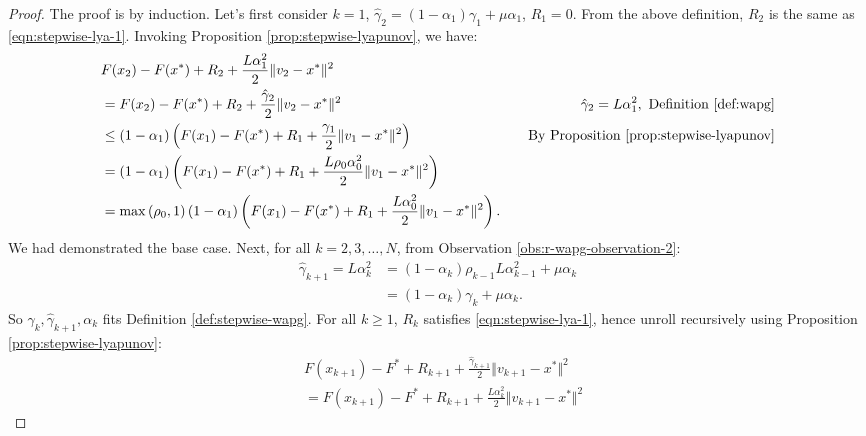 \documentclass[12pt]{article}
\begin{document}
    \begin{proof}  
        The proof is by induction. 
        Let's first consider $k = 1$, $\hat \gamma_2 = (1 - \alpha_1)\gamma_1 + \mu \alpha_1$, $R_1 = 0$. 
        From the above definition, $R_2$ is the same as \eqref{eqn:stepwise-lya-1}.
        Invoking Proposition \ref{prop:stepwise-lyapunov}, we have: 
        \begin{align*}
            & F(x_{2}) - F(x^*) + R_2 + \frac{L \alpha_1^2}{2}\Vert v_{2} - x^*\Vert^2
            \\
            & = F(x_{2}) - F(x^*) + R_2 + \frac{\hat \gamma_{2}}{2}\Vert v_{2} - x^*\Vert^2
            & \hat \gamma_2 = L \alpha_1^2 , \text{ Definition \ref{def:wapg}}
            \\
            &\le 
            (1 - \alpha_1)\left(
                F(x_1) - F(x^*) + R_1 + \frac{\gamma_1}{2}\Vert v_1 - x^*\Vert^2
            \right) 
            & \quad \text{By Proposition \ref{prop:stepwise-lyapunov}}
            \\
            &= 
            (1 - \alpha_1)\left(
                F(x_1) - F(x^*) + R_1 + \frac{L\rho_{0}\alpha_{0}^2}{2}\Vert v_1 - x^*\Vert^2
            \right) 
            \\
            &= \max\left(\rho_0, 1\right)
            (1 - \alpha_1)\left(
                F(x_1) - F(x^*) + R_1 + \frac{L\alpha_0^2}{2}\Vert v_1 - x^*\Vert^2
            \right). 
        \end{align*}
        We had demonstrated the base case. 
        Next, for all $k = 2, 3, \ldots, N$, from Observation \ref{obs:r-wapg-observation-2}: 
        \begin{align*}
            \hat \gamma_{k + 1} = L\alpha_{k}^2 
            &=(1 - \alpha_k)\rho_{k - 1}L\alpha_{k - 1}^2 + \mu\alpha_k
            \\
            &= (1 - \alpha_k)\gamma_k + \mu\alpha_k. 
        \end{align*}
        So $\gamma_k, \hat \gamma_{k + 1}, \alpha_k$ fits Definition \ref{def:stepwise-wapg}. 
        For all $k \ge 1$, $R_k$ satisfies \eqref{eqn:stepwise-lya-1}, hence unroll recursively using Proposition \ref{prop:stepwise-lyapunov}: 
        {\small
        \begin{align*}
            &
            F(x_{k + 1}) - F^* + R_{k + 1} + \frac{\hat\gamma_{k + 1}}{2}\Vert v_{k + 1} - x^*\Vert^2 
            \\
            &=
            F(x_{k + 1}) - F^* + R_{k + 1} + \frac{L \alpha_k^2}{2}\Vert v_{k + 1} - x^*\Vert^2

\end{align*}}
\end{proof}
\end{document}
